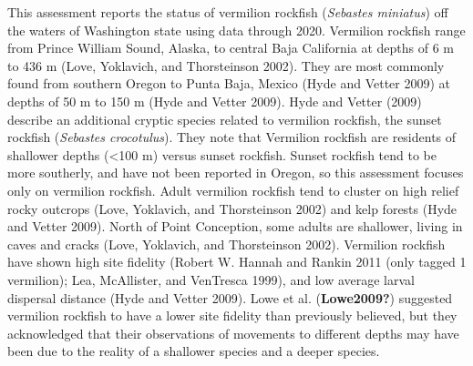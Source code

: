 \documentclass[11pt,
  english,
  a4paper,
]{article}
\begin{document}
This assessment reports the status of vermilion rockfish (\emph{Sebastes miniatus}) off the waters of Washington state using data through 2020. Vermilion rockfish range from Prince William Sound, Alaska, to central Baja California at depths of 6 m to 436 m {(Love, Yoklavich, and Thorsteinson 2002)\leavevmode\tagmcend\tagstructend}. They are most commonly found from southern Oregon to Punta Baja, Mexico {(Hyde and Vetter 2009)\leavevmode\tagmcend\tagstructend} at depths of 50 m to 150 m {(Hyde and Vetter 2009)\leavevmode\tagmcend\tagstructend}. Hyde and Vetter {(2009)\leavevmode\tagmcend\tagstructend} describe an additional cryptic species related to vermilion rockfish, the sunset rockfish (\emph{Sebastes crocotulus}). They note that Vermilion rockfish are residents of shallower depths (\textless100 m) versus sunset rockfish. Sunset rockfish tend to be more southerly, and have not been reported in Oregon, so this assessment focuses only on vermilion rockfish. Adult vermilion rockfish tend to cluster on high relief rocky outcrops {(Love, Yoklavich, and Thorsteinson 2002)\leavevmode\tagmcend\tagstructend} and kelp forests {(Hyde and Vetter 2009)\leavevmode\tagmcend\tagstructend}. North of Point Conception, some adults are shallower, living in caves and cracks {(Love, Yoklavich, and Thorsteinson 2002)\leavevmode\tagmcend\tagstructend}. Vermilion rockfish have shown high site fidelity {(Robert W. Hannah and Rankin 2011 (only tagged 1 vermilion); Lea, McAllister, and VenTresca 1999)\leavevmode\tagmcend\tagstructend}, and low average larval dispersal distance {(Hyde and Vetter 2009)\leavevmode\tagmcend\tagstructend}. Lowe et al. {(\textbf{Lowe2009?})\leavevmode\tagmcend\tagstructend} suggested vermilion rockfish to have a lower site fidelity than previously believed, but they acknowledged that their observations of movements to different depths may have been due to the reality of a shallower species and a deeper species.

\leavevmode\tagmcend\tagstructend\par
\end{document}
